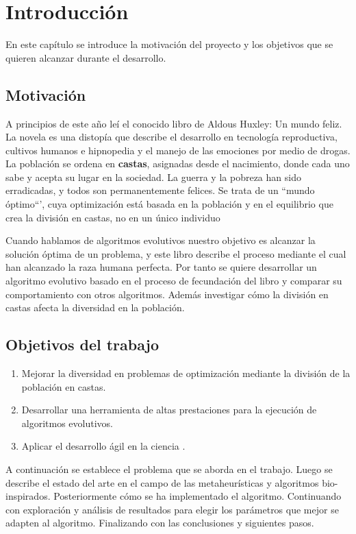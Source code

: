 \chapter{Introducción}

En este capítulo se introduce la motivación del proyecto y los objetivos que se quieren alcanzar durante el desarrollo. 

\section{Motivación}

A principios de este año leí el conocido libro de Aldous Huxley: Un mundo feliz. La novela es una
distopía que describe el desarrollo en tecnología reproductiva, cultivos humanos e hipnopedia y el manejo de las
emociones por medio de drogas. La población se ordena en \textbf{castas}, asignadas desde el nacimiento, donde cada uno
sabe y acepta su lugar en la sociedad. La guerra y la pobreza han sido erradicadas, y todos son permanentemente
felices. Se trata de un ``mundo óptimo``', cuya optimización está basada en la población y en el equilibrio que crea
la división en castas, no en un único individuo 

Cuando hablamos de algoritmos evolutivos nuestro objetivo es alcanzar la solución óptima de un problema, y este libro describe el 
proceso mediante el cual han alcanzado la raza humana perfecta. Por tanto se quiere desarrollar un algoritmo evolutivo basado en 
el proceso de fecundación del libro y comparar su comportamiento con otros algoritmos. Además investigar cómo la división en castas afecta 
la diversidad en la población.

\section{Objetivos del trabajo}

\begin{enumerate}
    \item Mejorar la diversidad en problemas de optimización mediante la división de la población en castas.
    \item Desarrollar una herramienta de altas prestaciones para la ejecución de algoritmos evolutivos.
    \item Aplicar el desarrollo ágil en la ciencia \cite{DBLP}.
\end{enumerate}


A continuación se establece el problema que se aborda en el trabajo. Luego se describe el estado del arte en el campo 
de las metaheurísticas y algoritmos bio-inspirados. Posteriormente cómo se ha implementado el algoritmo. Continuando con exploración
y análisis de resultados para elegir los parámetros que mejor se adapten al algoritmo. Finalizando con las conclusiones y siguientes pasos.   